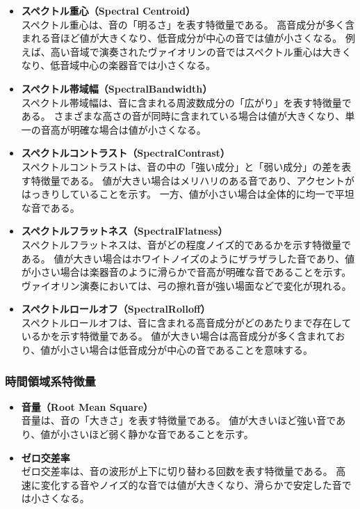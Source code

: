 \begin{itemize}
	\item \textbf{スペクトル重心（Spectral Centroid）}　\\
	    スペクトル重心は、音の「明るさ」を表す特徴量である。
		高音成分が多く含まれる音ほど値が大きくなり、低音成分が中心の音では値が小さくなる。
		例えば、高い音域で演奏されたヴァイオリンの音ではスペクトル重心は大きくなり、低音域中心の楽器音では小さくなる。
	\item \textbf{スペクトル帯域幅（SpectralBandwidth）}　\\
	    スペクトル帯域幅は、音に含まれる周波数成分の「広がり」を表す特徴量である。
		さまざまな高さの音が同時に含まれている場合は値が大きくなり、単一の音高が明確な場合は値が小さくなる。
	\item \textbf{スペクトルコントラスト（SpectralContrast）}　\\
	    スペクトルコントラストは、音の中の「強い成分」と「弱い成分」の差を表す特徴量である。
		値が大きい場合はメリハリのある音であり、アクセントがはっきりしていることを示す。
		一方、値が小さい場合は全体的に均一で平坦な音である。
	\item \textbf{スペクトルフラットネス（SpectralFlatness）}　\\
	    スペクトルフラットネスは、音がどの程度ノイズ的であるかを示す特徴量である。
		値が大きい場合はホワイトノイズのようにザラザラした音であり、値が小さい場合は楽器音のように滑らかで音高が明確な音であることを示す。
		ヴァイオリン演奏においては、弓の擦れ音が強い場面などで変化が現れる。
	\item \textbf{スペクトルロールオフ（SpectralRolloff）}　\\
	    スペクトルロールオフは、音に含まれる高音成分がどのあたりまで存在しているかを示す特徴量である。
	    値が大きい場合は高音成分が多く含まれており、値が小さい場合は低音成分が中心の音であることを意味する。
\end{itemize}

\subsubsection{時間領域系特徴量}

\begin{itemize}
	\item \textbf{音量（Root Mean Square）}　\\
	    音量は、音の「大きさ」を表す特徴量である。
        値が大きいほど強い音であり、値が小さいほど弱く静かな音であることを示す。
	\item \textbf{ゼロ交差率}　\\
	    ゼロ交差率は、音の波形が上下に切り替わる回数を表す特徴量である。
		高速に変化する音やノイズ的な音では値が大きくなり、滑らかで安定した音では小さくなる。
\end{itemize}

